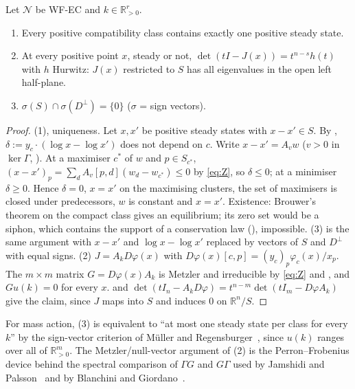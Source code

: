 \documentclass[11pt,a4paper]{report}
\newcommand{\Net}{\mathcal{N}}
\newcommand{\Rp}{\mathbb{R}_{>0}}
\begin{document}
\begin{theorem}\label{thm:U}
Let \(\Net\) be WF-EC and \(k\in\Rp^r\).
\begin{enumerate}
\item Every positive compatibility class contains exactly one positive steady state.
\item At every positive point \(x\), steady or not, \(\det(tI-J(x))=t^{n-s}h(t)\) with \(h\) Hurwitz: \(J(x)\) restricted
to \(S\) has all eigenvalues in the open left half-plane.
\item \(\sigma(S)\cap\sigma(D^\perp)=\{0\}\) (\(\sigma\) = sign vectors).
\end{enumerate}
\end{theorem}
\begin{proof}
(1), uniqueness. Let \(x,x'\) be positive steady states with \(x-x'\in S\). By , \(\delta:=y_c\cdot(\log
x-\log x')\) does not depend on \(c\). Write \(x-x'=A_vw\) (\(v>0\) in \(\ker\Gamma\), ). At a maximiser
\(c^*\) of \(w\) and \(p\in S_{c^*}\), \((x-x')_p=\sum_dA_v[p,d](w_d-w_{c^*})\le0\) by \eqref{eq:Z}, so
\(\delta\le0\); at a minimiser \(\delta\ge0\). Hence \(\delta=0\), \(x=x'\) on the maximising clusters, the set of
maximisers is closed under predecessors, \(w\) is constant and \(x=x'\). Existence: Brouwer's theorem on the compact
class gives an equilibrium; its zero set would be a siphon, which contains the support of a conservation law
(), impossible. (3) is the same argument with \(x-x'\) and \(\log x-\log x'\) replaced by vectors of
\(S\) and \(D^\perp\) with equal signs. (2) \(J=A_kD\varphi(x)\) with \(D\varphi(x)[c,p]=(y_c)_p\varphi_c(x)/x_p\). The
\(m\times m\) matrix \(G=D\varphi(x)A_k\) is Metzler and irreducible by \eqref{eq:Z} and , and
\(Gu(k)=0\) for every \(x\).  and \(\det(tI_n-A_kD\varphi)=t^{n-m}\det(tI_m-D\varphi A_k)\) give the
claim, since \(J\) maps into \(S\) and induces \(0\) on \(\mathbb{R}^n/S\).
\end{proof}

For mass action, (3) is equivalent to ``at most one steady state per class for every \(k\)'' by the sign-vector
criterion of Müller and Regensburger~\autocite[Prop.~3.1 of the arXiv version]{MullerRegensburger2012}, since \(u(k)\) ranges over all of \(\Rp^m\).
The Metzler/null-vector argument of (2) is the Perron--Frobenius device behind the spectral comparison of \(\Gamma G\) and
\(G\Gamma\) used by Jamshidi and Palsson~\autocite{JamshidiPalsson2009} and by Blanchini and
Giordano~\autocite[Thm~1]{BlanchiniGiordano2022}.
\end{document}
